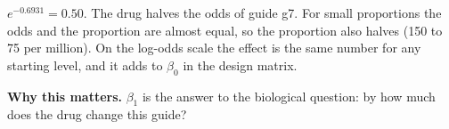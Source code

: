 \documentclass[12pt]{article}
\newcommand{\why}[1]{\par\smallskip\noindent\textcolor{barcsgreen!70!black}{\textbf{Why this matters.}} #1}
\begin{document}
\begin{exlist}[resume]
\item $e^{-0.6931} = 0.50$. The drug halves the odds of guide g7. For small
proportions the odds and the proportion are almost equal, so the proportion
also halves (150 to 75 per million). On the log-odds scale the effect is the
same number for any starting level, and it adds to $\beta_0$ in the design
matrix.
\why{$\beta_1$ is the answer to the biological question: by how much does
the drug change this guide?}
\end{exlist}
\end{document}
